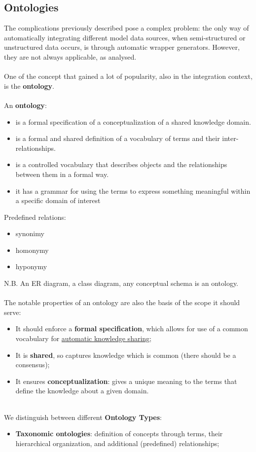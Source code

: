 \documentclass[10pt,a4paper]{article}
\newcommand{\nline}{\\~\\}
\begin{document}
\begin{justify}
\subsection{Ontologies}
The complications previously described pose a complex problem: the only way of automatically integrating different model data sources, when semi-structured or unstructured data occurs, is through automatic wrapper generators. However, they are not always applicable, as analysed. \nline One of the concept that gained a lot of popularity, also in the integration context, is the \textbf{ontology}. \nline
An \textbf{ontology}:
\begin{itemize}
	\item is a formal specification of a conceptualization of a shared knowledge domain. 
	\item is a formal and shared definition of a vocabulary of terms and their inter-relationships. 
	\item is a controlled vocabulary that describes objects and the relationships between them in a formal way. 
	\item it has a grammar for using the terms to express something meaningful within a specific domain of interest
\end{itemize} 
Predefined relations: 
\begin{itemize}
	\item synonimy
	\item homonymy
	\item hyponymy
\end{itemize} 
N.B. An ER diagram, a class diagram, any conceptual schema is an ontology. \nline
The notable properties of an ontology are also the basis of the scope it should serve:
\begin{itemize}
    \item It should enforce a \textbf{formal specification}, which allows for use of a common vocabulary for \uline{automatic knowledge sharing};
    \item It is \textbf{shared}, so captures knowledge which is common (there should be a consensus);
    \item It ensures \textbf{conceptualization}: gives a unique meaning to the terms that define the knowledge about a given domain. \nline
\end{itemize}
We distinguish between different \textbf{Ontology Types}:
\begin{itemize}
	\item \textbf{Taxonomic ontologies}: definition of concepts through terms, their hierarchical organization, and additional (predefined) relationships;

\end{itemize}
\end{justify}
\end{document}
